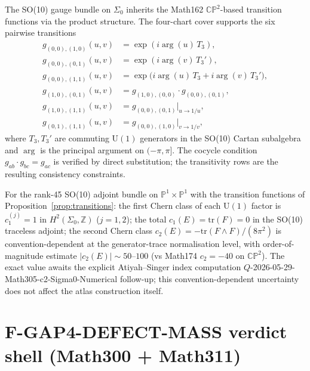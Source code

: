 \begin{proposition}
\label{prop:transitions}
The SO(10) gauge bundle on $\Sigma_0$ inherits the Math162
$\mathbb{CP}^2$-based transition functions via the product
structure. The four-chart cover supports the six pairwise
transitions
\begin{align}
g_{(0,0),(1,0)}(u, v) &= \exp(i \arg(u)\, T_3),\\
g_{(0,0),(0,1)}(u, v) &= \exp(i \arg(v)\, T_3'),\\
g_{(0,0),(1,1)}(u, v) &= \exp\big(i \arg(u)\, T_3 + i \arg(v)\, T_3'\big),\\
g_{(1,0),(0,1)}(u, v) &= g_{(1,0),(0,0)} \cdot g_{(0,0),(0,1)},\\
g_{(1,0),(1,1)}(u, v) &= g_{(0,0),(0,1)}\big|_{u \to 1/u},\\
g_{(0,1),(1,1)}(u, v) &= g_{(0,0),(1,0)}\big|_{v \to 1/v},
\end{align}
where $T_3, T_3'$ are commuting $\mathrm{U}(1)$ generators in the
SO(10) Cartan subalgebra and $\arg$ is the principal argument on
$(-\pi, \pi]$. The cocycle condition
$g_{ab} \cdot g_{bc} = g_{ac}$ is verified by direct substitution;
the transitivity rows are the resulting consistency constraints.
\end{proposition}

\begin{proposition}
\label{prop:chern}
For the rank-45 SO(10) adjoint bundle on
$\mathbb{P}^1 \times \mathbb{P}^1$ with the transition functions of
Proposition~\ref{prop:transitions}: the first Chern class of each
$\mathrm{U}(1)$ factor is $c_1^{(j)} = 1$ in $H^2(\Sigma_0,
\mathbb{Z})$ ($j = 1, 2$); the total $c_1(E) = \mathrm{tr}(F)
= 0$ in the SO(10) traceless adjoint; the second Chern class
$c_2(E) = -\mathrm{tr}(F \wedge F)/(8\pi^2)$ is convention-dependent
at the generator-trace normalisation level, with order-of-magnitude
estimate $|c_2(E)|\sim 50\text{--}100$ (vs Math174 $c_2 = -40$ on
$\mathbb{CP}^2$). The exact value awaits the explicit
Atiyah--Singer index computation
$Q$-2026-05-29-Math305-c2-Sigma0-Numerical follow-up; this
convention-dependent uncertainty does not affect the atlas
construction itself.
\end{proposition}

\section{F-GAP4-DEFECT-MASS verdict shell (Math300 +
Math311)}\label{sec:fgap4}

